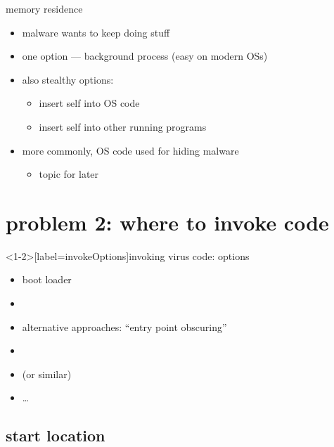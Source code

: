 \begin{frame}{memory residence}
    \begin{itemize}
    \item malware wants to keep doing stuff
    \item one option --- background process (easy on modern OSs)
    \item also stealthy options:
        \begin{itemize}
        \item insert self into OS code
        \item insert self into other running programs
        \end{itemize}
    \item more commonly, OS code used for hiding malware
        \begin{itemize}
        \item topic for later
        \end{itemize}
    \end{itemize}
\end{frame}

\begin{frame}{}
\end{frame}

\section{problem 2: where to invoke code}


\begin{frame}<1-2>[label=invokeOptions]{invoking virus code: options}
    \begin{itemize}
    \item boot loader
    \item {} 
    \item alternative approaches: ``entry point obscuring''
    \item {}
    \item {} (or similar)
    \item \ldots
    \end{itemize}
\end{frame}

\subsection{start location}

